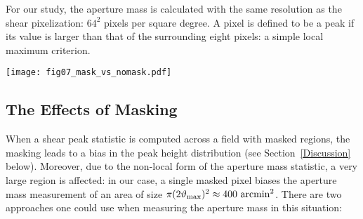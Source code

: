 For our study, the aperture mass is calculated with the same resolution as the
shear pixelization: $64^2$ pixels per square degree.  A pixel is defined to be
a peak if its value is larger than that of the surrounding eight pixels:
a simple local maximum criterion. 

\begin{figure*}
 \centering
 \texttt{[image: fig07\_mask\_vs\_nomask.pdf]}
 \caption{
   Comparison of the masked and unmasked peak distributions.
   \textit{left panel:} the peak distributions without the use of KL.
   The black line is the result with no masking, while the red and green
   lines show the two \naive methods of correcting for the mask (see
   Section~\ref{MaskingEffects}).
   \textit{right panel:}  the masked and unmasked peak distributions
   after applying KL. 
   Neither \naive method of mask-correction adequately recovers 
   the underlying peak distribution.  It is evident, however, that 
   the KL-based interpolation procedure recovers a mass map with 
   a similar peak distribution to the unmasked KL map.
   It should be noted that the unmasked peak distribution 
   (black line, left panel) is not identical to the unmasked peak distribution
   after application of KL (black line, right panel).  This difference is
   addressed in Figure~\ref{fig_num_peaks}.
   \label{fig_mask_nomask} 
 }
\end{figure*} 

\subsection{The Effects of Masking}
\label{MaskingEffects}
When a shear peak statistic is computed across a field with masked regions,
the masking leads to a bias in the peak height distribution
(see Section~\ref{Discussion} below).  Moreover, due
to the non-local form of the aperture mass statistic, a very large region is
affected: in our case, a single masked pixel biases the aperture mass 
measurement of an area of size
 $\pi(2\vartheta_{\rm max})^2 \approx 400\ {\rm arcmin}^2$.  
There are two \naive approaches one could use when measuring the 
aperture mass in this situation:

